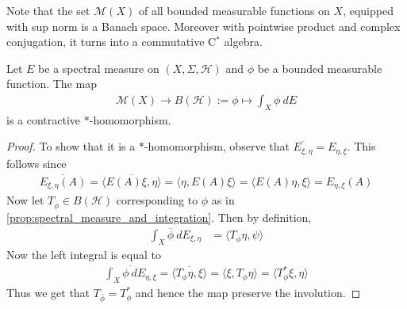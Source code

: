Note that the set $\mathcal{M}(X)$ of all bounded measurable functions on $X$,
equipped with sup norm is a Banach space. Moreover with pointwise
product and complex conjugation, it turns into a commutative C$^*$ algebra.

\begin{theorem}
  Let $E$ be a spectral measure on $(X, \Sigma, \mathcal{H})$ and
  \marginnote{ \scriptsize \it \textcolor{red}{verify if $\phi$ is a
  linear functional}}
  $\phi$ be a bounded measurable function. The map
  \begin{align*}
    \mathcal{M}(X) \to B(\mathcal{H}):= \phi \mapsto \int_ X \phi \ d E
  \end{align*}
  is a contractive $*$-homomorphism.
\end{theorem}
\begin{proof}
  To show that it is a $*$-homomorphism, observe that
  $\overline{E_{\xi, \eta}} = E_{\eta, \xi}$. This follows since
  \begin{align*}
    \overline{E_{\xi, \eta}(A)} = \overline{ \langle E(A) \xi , \eta
    \rangle } = \langle \eta , E(A) \xi \rangle = \langle E(A)  \eta , \xi
    \rangle = E_{\eta,  \xi}(A)
  \end{align*}
  Now let $T_{\overline{\phi}} \in B(\mathcal{H})$ corresponding to
  $\phi$ as in \autoref{prop:spectral_measure_and_integration}. Then
  by definition,
  \begin{align*}
    \int_X \overline{\phi} \ d  E_{\xi, \eta} &= \langle T_{\overline{
    \phi}}  \eta, \psi  \rangle
  \end{align*}
  Now the left integral is equal to
  \begin{align*}
    \overline{\int_X  \phi \ d E_{\eta, \xi}} = \overline{\langle
    T_{\phi} \eta ,  \xi \rangle } = \langle \xi ,  T_\phi \eta
    \rangle = \langle T_\phi^* \xi ,  \eta \rangle
  \end{align*}
  Thus we get that $T_{\overline{\phi}} = T_{\phi}^*$ and hence the
  map preserve the involution.


\end{proof}
